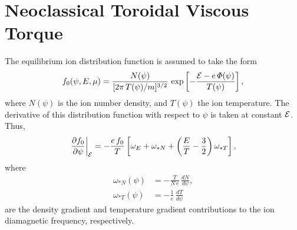 \documentclass[12pt,prb,aps,notitlepage]{revtex4-1}
\begin{document}
\section{Neoclassical Toroidal Viscous Torque}
The equilibrium ion distribution function is assumed to take the form 
\begin{equation}
f_0(\psi,E,\mu) = \frac{N(\psi)}{[2\pi\,T(\psi)/m]^{3/2}}\,\exp\left[-\frac{{\cal E}-e\,{\mit\Phi}(\psi)}{T(\psi)}\right],
\end{equation} 
where $N(\psi)$ is the ion number density, and $T(\psi)$ the ion temperature. The derivative of this distribution function with respect to $\psi$ is
taken at constant ${\cal E}$. Thus, 
\begin{equation}\label{e128a}
\left.\frac{\partial f_0}{\partial\psi}\right|_{\cal E}= -\frac{e\,f_0}{T}\left[\omega_E +\omega_{\ast N}+ \left(\frac{E}{T}-\frac{3}{2}\right)\omega_{\ast T}\right],
\end{equation}
where
\begin{align}
\omega_{\ast N}(\psi)&= - \frac{T}{N\,e}\,\frac{dN}{d\psi},\\[0.5ex]
\omega_{\ast T}(\psi)&=-\frac{1}{e}\,\frac{dT}{d\psi}
\end{align}
are the density gradient and temperature gradient contributions to the ion diamagnetic frequency, respectively. 
\end{document}
